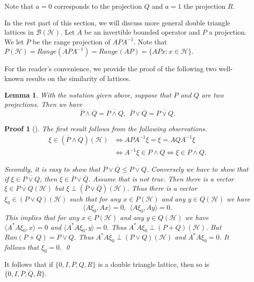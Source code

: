\documentclass{jaums}
\theoremstyle{thmit} %
\newtheorem{lemma}[theorem]{Lemma}
\theoremstyle{thmrm} %
\newtheorem*{oldproof}{Proof}
\renewenvironment{proof}[1][{}]{\begin{oldproof}[#1]}{\qed\end{oldproof}}
\begin{document}
Note that $a=0$ corresponds to the projection $Q$ and $a=1$ the projection $R$.



In the rest part of this section, we will discuss more general double triangle
lattices in $\mathcal{B}(\mathcal{H})$. Let $A$ be an invertible bounded
operator
and $P$ a projection. We let $\overline{P}$ be the range projection of
$APA^{-1}$. Note that
$\overline{P}(\mathcal{H})=Range(APA^{-1})=Range(AP)=\{APx:x\in\mathcal{H}\}$.

For the reader's convenience, we provide the proof of the following two
well-known results on the similarity of lattices.

\begin{lemma} With the notation given above, suppose that $P$ and $Q$ are two
projections. Then we have
$$\overline{P}\wedge\overline{Q}=\overline{P\wedge Q}, \    \
\overline{P}\vee\overline{Q}=\overline{P\vee Q}.$$
\end{lemma}
\begin{proof} The first result follows from the following observations.
\begin{align*} \xi\in (\overline{P}\wedge
\overline{Q})(\mathcal{H})&\Leftrightarrow  APA^{-1}\xi=\xi=AQA^{-1}\xi
\\ &\Leftrightarrow A^{-1}\xi\in P\wedge Q\Leftrightarrow
\xi\in \overline{P\wedge Q}.
\end{align*}

Secondly, it is easy to show that
$\overline{P}\vee\overline{Q}\leq\overline{P\vee Q}$. Conversely we have to show
that if $\xi\in\overline{P\vee Q}$,
then $\xi\in\overline{P}\vee\overline{Q}$. Assume that is not true. Then there
is a
vector $\xi\in\overline{P\vee Q}(\mathcal{H})$ but $\xi\perp
(\overline{P}\vee\overline{Q})(\mathcal{H})$.
Thus there is a vector $\xi_0\in (P\vee Q)(\mathcal{H})$ such that for any $x\in
P(\mathcal{H})$ and any $y\in Q(\mathcal{H})$ we have
$$\langle A\xi_0, Ax\rangle=0, \   \ \langle A\xi_0,Ay\rangle=0.$$
This implies that for any $x\in P(\mathcal{H})$ and any $y\in Q(\mathcal{H})$ we
have $\langle A^{*}A\xi_0,x\rangle=0$ and $\langle A^{*}A\xi_0,y\rangle=0$.
Thus $A^{*}A\xi_0\perp (P+Q)(\mathcal{H})$. But $Ran(P+Q)=P\vee Q$.
Thus $A^{*}A\xi_0\perp(P\vee Q)(\mathcal{H})$ and $A^{*}A\xi_0=0$. It follows
that $\xi_0=0$.
\end{proof}

It follows that if $\{ 0, I, P, Q, R \}$ is a double triangle lattice, then so
is $\{0, I, \overline{P}, \overline{Q}, \overline{R} \}$.
\end{document}

